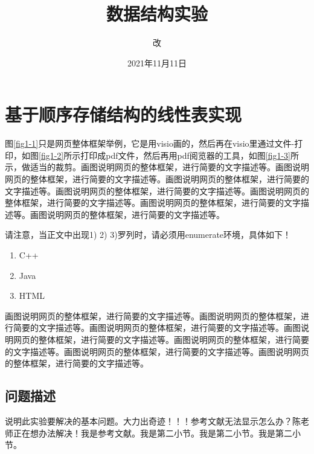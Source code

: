 \documentclass[supercite]{Experimental_Report}
\title{~~~~~~数据结构实验~~~~~~}
\author{改}
\date{2021年11月11日}
\theoremstyle{definition}
\begin{document}
\maketitle

\clearpage


\tableofcontents[level=2]

\clearpage


\section{基于顺序存储结构的线性表实现}

图\ref{fig1-1}只是网页整体框架举例，它是用visio画的，然后再在visio里通过文件-打印，如图\ref{fig1-2}所示打印成pdf文件，然后再用pdf阅览器的工具，如图\ref{fig1-3}所示，做适当的裁剪。画图说明网页的整体框架，进行简要的文字描述等。画图说明网页的整体框架，进行简要的文字描述等。画图说明网页的整体框架，进行简要的文字描述等。画图说明网页的整体框架，进行简要的文字描述等。画图说明网页的整体框架，进行简要的文字描述等。画图说明网页的整体框架，进行简要的文字描述等。画图说明网页的整体框架，进行简要的文字描述等。

请注意，当正文中出现1) 2) 3)罗列时，请必须用enumerate环境，具体如下！

\begin{enumerate}
\renewcommand{\labelenumi}{\theenumi)}
	\item C++
	\item Java
	\item HTML
\end{enumerate}

画图说明网页的整体框架，进行简要的文字描述等。画图说明网页的整体框架，进行简要的文字描述等。画图说明网页的整体框架，进行简要的文字描述等。画图说明网页的整体框架，进行简要的文字描述等。画图说明网页的整体框架，进行简要的文字描述等。画图说明网页的整体框架，进行简要的文字描述等。画图说明网页的整体框架，进行简要的文字描述等。

\subsection{问题描述}

说明此实验要解决的基本问题。大力出奇迹！！！参考文献无法显示怎么办？陈老师正在想办法解决\cite{STR2021Neurocom, AVS2021Neurocom}！我是参考文献。我是第二小节\cite{Mehrabian1974An}。我是第二小节\cite{Rezaei2014CVPR}。我是第二小节\cite{Ramnath2008IJCV}。
\end{document}
